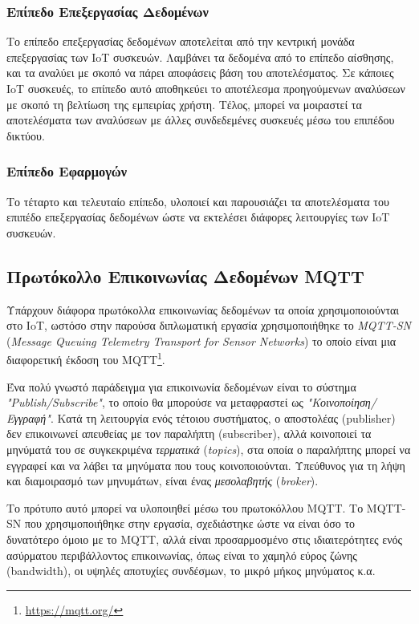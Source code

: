 \subsubsection{Επίπεδο Επεξεργασίας Δεδομένων}
\label{subsubsec:data_proc}

Το επίπεδο επεξεργασίας δεδομένων αποτελείται από την κεντρική μονάδα επεξεργασίας των IoT συσκευών. Λαμβάνει τα δεδομένα από το επίπεδο αίσθησης, και τα αναλύει με σκοπό να πάρει αποφάσεις βάση του αποτελέσματος. Σε κάποιες IoT συσκευές, το επίπεδο αυτό αποθηκεύει το αποτέλεσμα προηγούμενων αναλύσεων με σκοπό τη βελτίωση της εμπειρίας χρήστη. Τέλος, μπορεί να μοιραστεί τα αποτελέσματα των αναλύσεων με άλλες συνδεδεμένες συσκευές μέσω του επιπέδου δικτύου.

\subsubsection{Επίπεδο Εφαρμογών}
\label{subsubsec:application}

Το τέταρτο και τελευταίο επίπεδο, υλοποιεί και παρουσιάζει τα αποτελέσματα του επιπέδο επεξεργασίας δεδομένων ώστε να εκτελέσει διάφορες λειτουργίες των IoT συσκευών.

\subsection{Πρωτόκολλο Επικοινωνίας Δεδομένων MQTT}
\label{subsec:mqtt}

Υπάρχουν διάφορα πρωτόκολλα επικοινωνίας δεδομένων τα οποία χρησιμοποιούνται στο IoT, ωστόσο στην παρούσα διπλωματική εργασία χρησιμοποιήθηκε το \textit{MQTT-SN} (\textit{Message Queuing Telemetry Transport for Sensor Networks}) το οποίο είναι μια διαφορετική έκδοση του MQTT\footnote{\url{https://mqtt.org/}}.

Ένα πολύ γνωστό παράδειγμα για επικοινωνία δεδομένων είναι το σύστημα \textit{"Publish/Subscribe"}, το οποίο θα μπορούσε να μεταφραστεί ως \textit{"Κοινοποίηση/Εγγραφή"}. Κατά τη λειτουργία ενός τέτοιου συστήματος, ο αποστολέας (publisher) δεν επικοινωνεί απευθείας με τον παραλήπτη (subscriber), αλλά κοινοποιεί τα μηνύματά του σε συγκεκριμένα \textit{τερματικά} (\textit{topics}), στα οποία ο παραλήπτης μπορεί να εγγραφεί και να λάβει τα μηνύματα που τους κοινοποιούνται. Υπεύθυνος για τη λήψη και διαμοιρασμό των μηνυμάτων, είναι ένας \textit{μεσολαβητής} (\textit{broker}).

Το πρότυπο αυτό μπορεί να υλοποιηθεί μέσω του πρωτοκόλλου MQTT. Το MQTT-SN που χρησιμοποιήθηκε στην εργασία, σχεδιάστηκε ώστε να είναι όσο το δυνατότερο όμοιο με το MQTT, αλλά είναι προσαρμοσμένο στις ιδιαιτερότητες ενός ασύρματου περιβάλλοντος επικοινωνίας, όπως είναι το χαμηλό εύρος ζώνης (bandwidth), οι υψηλές αποτυχίες συνδέσμων, το μικρό μήκος μηνύματος κ.α.